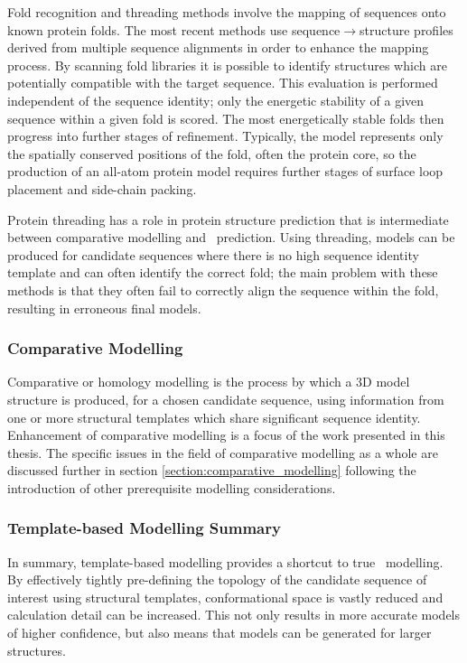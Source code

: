 Fold recognition\cite{SIMULATION:FoldRecognition} and threading\cite{SIMULATION:Threading} methods involve the mapping of sequences onto known protein folds.  The
most recent methods use sequence$\to$structure profiles derived from multiple
sequence alignments in order to enhance
the mapping process\cite{SIMULATION:GenThreader,SIMULATION:Karplus2001}. By scanning fold libraries it is possible to identify structures which are potentially compatible with the target sequence.
This evaluation is performed independent of the sequence identity; only the
energetic stability of a given sequence within a given fold is scored. 
The
most energetically stable folds then progress into further stages of refinement.
Typically, the model represents only the spatially conserved positions of the fold, often the protein core, so the production of an all-atom protein model  requires further stages of surface loop placement and side-chain packing.

Protein threading has a role in protein structure prediction that is intermediate between comparative modelling and \abinitio\ prediction. Using threading, models can be produced for candidate sequences where there
is no high sequence identity template and can often identify the correct
fold; the main problem with these methods is that they often fail to correctly
align the sequence within the fold, resulting in erroneous final models\cite{METHOD:CASP:FoldRecognition}.

\subsubsection{Comparative Modelling}


Comparative or homology modelling is the process by which a 3D model structure is produced, for a chosen candidate sequence, using information
from one or more structural templates which share significant sequence identity. 
Enhancement of comparative modelling is a focus of the work presented in this thesis. The
specific issues in the field of comparative
modelling as a whole are discussed further in section \ref{section:comparative_modelling}
following the introduction of other prerequisite modelling considerations.


\subsubsection{Template-based Modelling Summary}

In summary, template-based modelling provides a shortcut to true \abinitio\ modelling. By effectively tightly pre-defining the topology of the candidate sequence of interest using structural templates, conformational space is vastly reduced and calculation detail can be increased. This not only results
in more accurate models of higher confidence, but also means that models can be generated for larger structures. 

